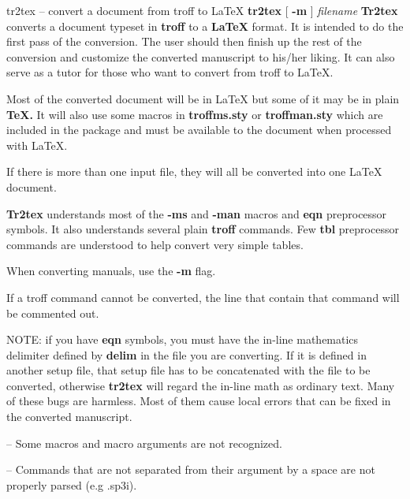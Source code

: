 


%
%

tr2tex -- convert a document from troff to LaTeX
{\bf tr2tex}
[
{\bf -m}
]
{\it filename}
{\bf Tr2tex}
converts a document typeset in
{\bf troff}
to a
{\bf LaTeX}
format.
It is intended to do the first pass of the conversion. The user
should then finish up the rest of the conversion and customize the
converted manuscript to his/her liking.
It can also serve as a tutor for those who want to convert from
troff to LaTeX.
\par
Most of the converted document will be in LaTeX
but some of it may
be in plain
{\bf TeX.}
It will also use some macros in
{\bf troffms.sty}
or
{\bf troffman.sty}
which are included in the package and must be available to the document
when processed with LaTeX.
\par
If there is more than one input file, they will all be converted into
one LaTeX document.
\par
{\bf Tr2tex}
understands most of the
{\bf -ms}
and
{\bf -man}
macros and
{\bf eqn}
preprocessor symbols. It also understands several plain
{\bf troff}
commands. Few
{\bf tbl}
preprocessor commands are understood to help convert very simple tables.
\par
When converting manuals, use the
{\bf -m}
flag.
\par
If a troff command cannot be converted, the line that contain that
command will be commented out.
\par
NOTE: if you have
{\bf eqn}
symbols, you must have the in-line mathematics delimiter defined by
{\bf delim}
in the file you are converting. If it is defined in another
setup file, that setup file has to be concatenated with the
file to be converted, otherwise
{\bf tr2tex}
will regard the in-line math as ordinary text.
Many of these bugs are harmless. Most of them cause local errors
that can be fixed in the converted manuscript.
\par
-- Some macros and macro arguments are not recognized.
\par
-- Commands that are not separated from their argument by a space are
not properly parsed (e.g .sp3i).
\par
